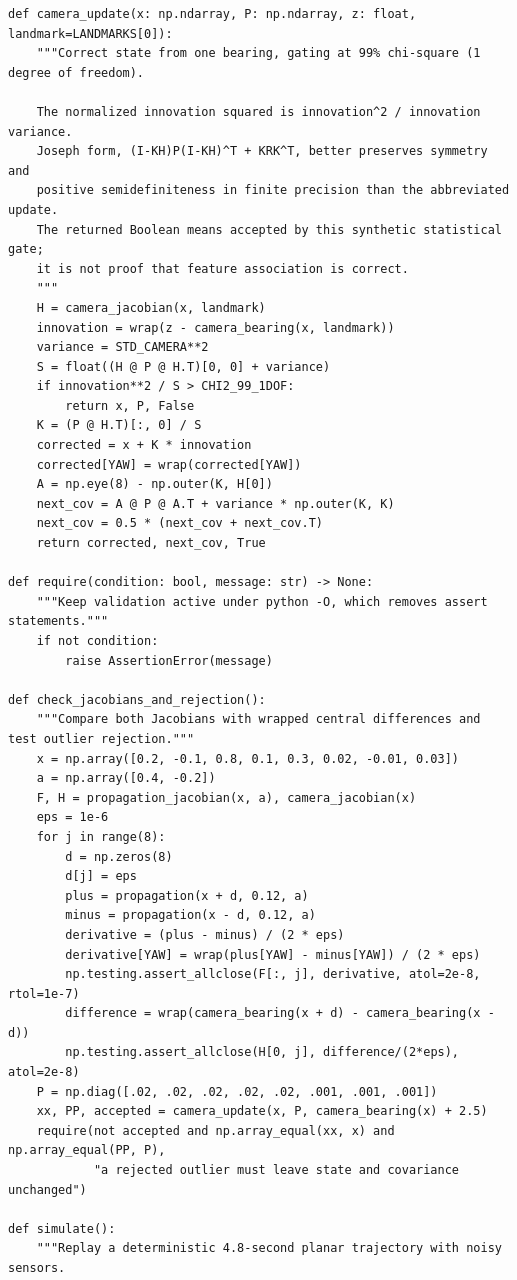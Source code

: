 \begin{verbatim}
def camera_update(x: np.ndarray, P: np.ndarray, z: float, landmark=LANDMARKS[0]):
    """Correct state from one bearing, gating at 99% chi-square (1 degree of freedom).

    The normalized innovation squared is innovation^2 / innovation variance.
    Joseph form, (I-KH)P(I-KH)^T + KRK^T, better preserves symmetry and
    positive semidefiniteness in finite precision than the abbreviated update.
    The returned Boolean means accepted by this synthetic statistical gate;
    it is not proof that feature association is correct.
    """
    H = camera_jacobian(x, landmark)
    innovation = wrap(z - camera_bearing(x, landmark))
    variance = STD_CAMERA**2
    S = float((H @ P @ H.T)[0, 0] + variance)
    if innovation**2 / S > CHI2_99_1DOF:
        return x, P, False
    K = (P @ H.T)[:, 0] / S
    corrected = x + K * innovation
    corrected[YAW] = wrap(corrected[YAW])
    A = np.eye(8) - np.outer(K, H[0])
    next_cov = A @ P @ A.T + variance * np.outer(K, K)
    next_cov = 0.5 * (next_cov + next_cov.T)
    return corrected, next_cov, True

def require(condition: bool, message: str) -> None:
    """Keep validation active under python -O, which removes assert statements."""
    if not condition:
        raise AssertionError(message)

def check_jacobians_and_rejection():
    """Compare both Jacobians with wrapped central differences and test outlier rejection."""
    x = np.array([0.2, -0.1, 0.8, 0.1, 0.3, 0.02, -0.01, 0.03])
    a = np.array([0.4, -0.2])
    F, H = propagation_jacobian(x, a), camera_jacobian(x)
    eps = 1e-6
    for j in range(8):
        d = np.zeros(8)
        d[j] = eps
        plus = propagation(x + d, 0.12, a)
        minus = propagation(x - d, 0.12, a)
        derivative = (plus - minus) / (2 * eps)
        derivative[YAW] = wrap(plus[YAW] - minus[YAW]) / (2 * eps)
        np.testing.assert_allclose(F[:, j], derivative, atol=2e-8, rtol=1e-7)
        difference = wrap(camera_bearing(x + d) - camera_bearing(x - d))
        np.testing.assert_allclose(H[0, j], difference/(2*eps), atol=2e-8)
    P = np.diag([.02, .02, .02, .02, .02, .001, .001, .001])
    xx, PP, accepted = camera_update(x, P, camera_bearing(x) + 2.5)
    require(not accepted and np.array_equal(xx, x) and np.array_equal(PP, P),
            "a rejected outlier must leave state and covariance unchanged")

def simulate():
    """Replay a deterministic 4.8-second planar trajectory with noisy sensors.


\end{verbatim}
